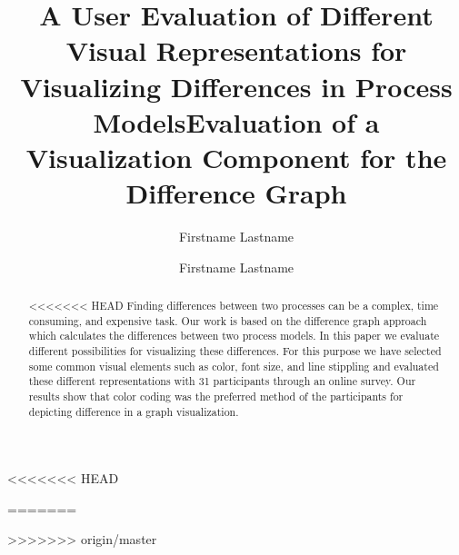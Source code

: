 \documentclass{llncs}
\begin{document}
<<<<<<< HEAD
\title{A User Evaluation of Different Visual Representations for Visualizing Differences in Process Models}

=======
\title{Evaluation of a Visualization Component for the Difference Graph}
>>>>>>> origin/master
\author{Firstname Lastname \and Firstname Lastname}
\maketitle

\begin{abstract}
<<<<<<< HEAD
Finding differences between two processes can be a complex, time consuming, and expensive task. Our work is based on the difference graph approach which calculates the differences between two process models. In this paper we evaluate different possibilities for visualizing these differences. For this purpose we have selected some common visual elements such as color, font size, and line stippling and evaluated these different representations with 31 participants through an online survey. Our results show that color coding was the preferred method of the participants for depicting difference in a graph visualization.
\end{abstract}
\end{document}
